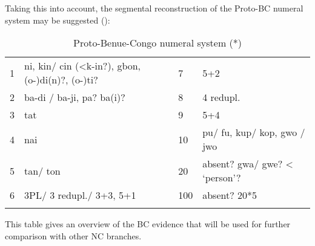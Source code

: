 Taking this into account, the segmental reconstruction of the Proto-BC numeral system may be suggested ():

\begin{table}
\caption{\label{tab:3:64}Proto-Benue-Congo numeral system (*)}


\begin{tabularx}{\textwidth}{lXll}
\lsptoprule

{1} & ni, kin/ cin (<k-in?), gbon,\newline (o-)di(n)?, (o-)ti? & {7} & 5+2\\
{2} & ba-di / ba-ji, pa? ba(i)? & {8} & 4 redupl.\\
{3} & tat & {9} & 5+4\\
{4} & nai & {10} & pu/ fu, kup/ kop, gwo / jwo\\
{5} & tan/ ton & {20} & absent? gwa/ gwe? < ‘person’?\\
{6} & 3PL/ 3 redupl./ 3+3, 5+1 & {100} & absent? 20*5\\
\lspbottomrule
\end{tabularx}
\end{table}

This table gives an overview of the BC evidence that will be used for further comparison with other NC branches. 

